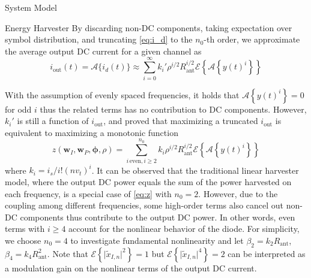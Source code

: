 \documentclass{IEEEtran}
\begin{document}
\begin{section}{System Model}
\begin{subsection}{Energy Harvester}
		By discarding non-DC components, taking expectation over symbol distribution, and truncating \ref{eq:i_d} to the $n_0$-th order, we approximate the average output DC current for a given channel as
		\begin{equation}\label{eq:i_out}
			i_{\text{out}}(t)=\mathcal{A}\{i_d(t)\}\approx\sum_{i=0}^{\infty}{k_i'}{\rho^{i/2}}{R_{\text{ant}}^{i/2}}\mathcal{E}\left\{{\mathcal{A}\left\{y(t)^i\right\}}\right\}
		\end{equation}

		With the assumption of evenly spaced frequencies, it holds that $\mathcal{A}\left\{y(t)^i\right\}=0$ for odd $i$ thus the related terms has no contribution to DC components. However, $k_i'$ is still a function of $i_{\text{out}}$, and \cite{Clerckx2016a} proved that maximizing a truncated $i_{\text{out}}$ is equivalent to maximizing a monotonic function
		\begin{equation}\label{eq:z}
			z(\boldsymbol{w}_I,\boldsymbol{w}_P,\boldsymbol{\phi},\rho)=\sum_{i\,\text{even},i\ge2}^{n_0}{k_i}{\rho^{i/2}}{R_{\text{ant}}^{i/2}}{\mathcal{E}\left\{\mathcal{A}\left\{y(t)^i\right\}\right\}}
		\end{equation}
		where $k_i=i_s/i!(nv_t)^i$. It can be observed that the traditional linear harvester model, where the output DC power equals the sum of the power harvested on each frequency, is a special case of \ref{eq:z} with $n_0=2$. However, due to the coupling among different frequencies, some high-order terms also cancel out non-DC components thus contribute to the output DC power. In other words, even terms with $i \ge 4$ account for the nonlinear behavior of the diode. For simplicity, we choose $n_0=4$ to investigate fundamental nonlinearity and let $\beta_2={k_2}{R_{\text{ant}}}$, $\beta_4={k_4}{R_{\text{ant}}^2}$. Note that $\mathcal{E}\left\{\lvert\tilde{x}_{I,n}\rvert^2\right\}=1$ but $\mathcal{E}\left\{\lvert\tilde{x}_{I,n}\rvert^4\right\}=2$ can be interpreted as a modulation gain on the nonlinear terms of the output DC current.


\end{subsection}
\end{section}
\end{document}
